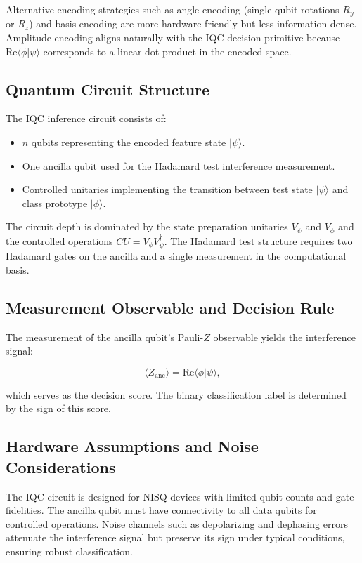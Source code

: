 \documentclass[conference]{IEEEtran}
\begin{document}
Alternative encoding strategies such as angle encoding (single-qubit rotations $R_y$ or $R_z$) and basis encoding are more hardware-friendly but less information-dense. Amplitude encoding aligns naturally with the IQC decision primitive because $\mathrm{Re}\langle\phi|\psi\rangle$ corresponds to a linear dot product in the encoded space.

\subsection{Quantum Circuit Structure}

The IQC inference circuit consists of:

\begin{itemize}
    \item $n$ qubits representing the encoded feature state $|\psi\rangle$.
    \item One ancilla qubit used for the Hadamard test interference measurement.
    \item Controlled unitaries implementing the transition between test state $|\psi\rangle$ and class prototype $|\phi\rangle$.
\end{itemize}

The circuit depth is dominated by the state preparation unitaries $V_\psi$ and $V_\phi$ and the controlled operations $CU = V_\phi V_\psi^\dagger$. The Hadamard test structure requires two Hadamard gates on the ancilla and a single measurement in the computational basis.

\subsection{Measurement Observable and Decision Rule}

The measurement of the ancilla qubit's Pauli-$Z$ observable yields the interference signal:

\begin{equation}
\langle Z_{\text{anc}} \rangle = \mathrm{Re}\langle \phi | \psi \rangle,
\end{equation}

which serves as the decision score. The binary classification label is determined by the sign of this score.

\subsection{Hardware Assumptions and Noise Considerations}

The IQC circuit is designed for NISQ devices with limited qubit counts and gate fidelities. The ancilla qubit must have connectivity to all data qubits for controlled operations. Noise channels such as depolarizing and dephasing errors attenuate the interference signal but preserve its sign under typical conditions, ensuring robust classification.
\end{document}
